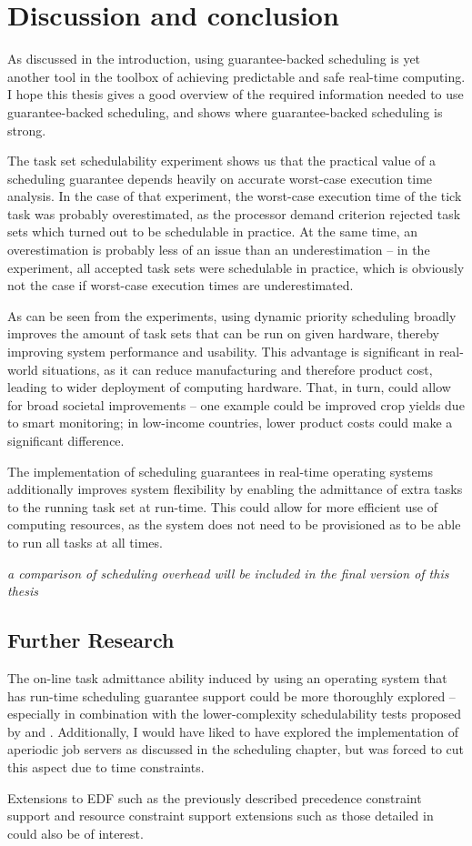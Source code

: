 \chapter{Discussion and conclusion}
As discussed in the introduction, using guarantee-backed scheduling is yet another tool in the toolbox of achieving predictable and safe real-time computing. I hope this thesis gives a good overview of the required information needed to use guarantee-backed scheduling, and shows where guarantee-backed scheduling is strong.

The task set schedulability experiment shows us that the practical value of a scheduling guarantee depends heavily on accurate worst-case execution time analysis. In the case of that experiment, the worst-case execution time of the \ucos tick task was probably overestimated, as the processor demand criterion rejected task sets which turned out to be schedulable in practice. At the same time, an overestimation is probably less of an issue than an underestimation -- in the experiment, all accepted task sets were schedulable in practice, which is obviously not the case if worst-case execution times are underestimated.

As can be seen from the experiments, using dynamic priority scheduling broadly improves the amount of task sets that can be run on given hardware, thereby improving system performance and usability. This advantage is significant in real-world situations, as it can reduce manufacturing and therefore product cost, leading to wider deployment of computing hardware. That, in turn, could allow for broad societal improvements -- one example could be improved crop yields due to smart monitoring; in low-income countries, lower product costs could make a significant difference.

The implementation of scheduling guarantees in real-time operating systems additionally improves system flexibility by enabling the admittance of extra tasks to the running task set at run-time. This could allow for more efficient use of computing resources, as the system does not need to be provisioned as to be able to run all tasks at all times.

\emph{a comparison of scheduling overhead will be included in the final version of this thesis}

\section{Further Research}
The on-line task admittance ability induced by using an operating system that has run-time scheduling guarantee support could be more thoroughly explored -- especially in combination with the lower-complexity schedulability tests proposed by \textcite{Albers} and \textcite{Zhang2009}. Additionally, I would have liked to have explored the implementation of aperiodic job servers as discussed in the scheduling chapter, but was forced to cut this aspect due to time constraints.

Extensions to EDF such as the previously described precedence constraint support and resource constraint support extensions such as those detailed in \textcite[\S 7]{buttazzo2011hard} could also be of interest.

